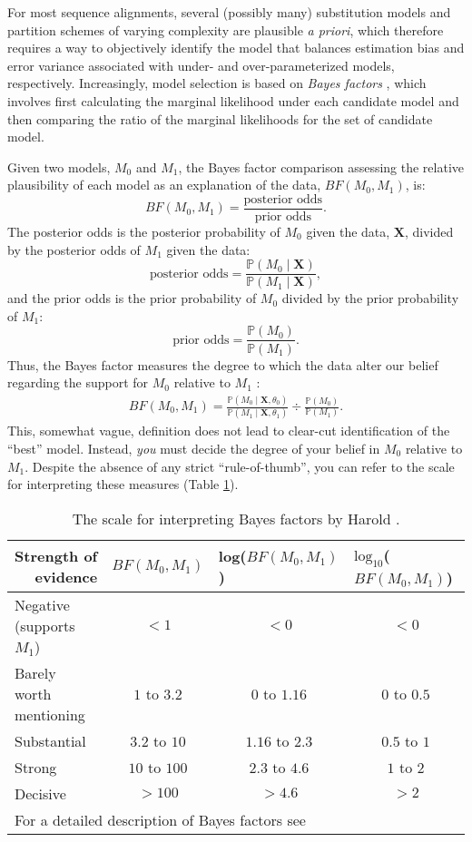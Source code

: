 For most sequence alignments, several (possibly many) substitution models and partition schemes of varying complexity are plausible {\it a priori}, which therefore requires a way to objectively identify the model that balances estimation bias and error variance associated with under- and over-parameterized models, respectively.
Increasingly, model selection is based on \textit{Bayes factors} \citep[{\it e.g.},][]{Suchard2001,Lartillot2006,Xie2011,Baele2012,Baele2013}, which involves first calculating the marginal likelihood under each candidate model and then comparing the ratio of the marginal likelihoods for the set of candidate model.

 
Given two models, $M_0$ and $M_1$, the Bayes factor comparison assessing the relative plausibility of each model as an explanation of the data, $BF(M_0,M_1)$, is:
$$BF(M_0,M_1) = \frac{\mbox{posterior odds}}{\mbox{prior odds}}.$$
The posterior odds is the posterior probability of $M_0$ given the data, $\mathbf X$, divided by the posterior odds of $M_1$ given the data:
$$\mbox{posterior odds} = \frac{\mathbb{P}(M_0 \mid \mathbf X)}{\mathbb{P}(M_1 \mid \mathbf X)},$$
and the prior odds is the prior probability of $M_0$ divided by the prior probability of $M_1$:
$$\mbox{prior odds} = \frac{\mathbb{P}(M_0)}{\mathbb{P}(M_1)}.$$
Thus, the Bayes factor measures the degree to which the data alter our belief regarding the support for $M_0$ relative to $M_1$ \citep{Lavine1999}:
\begin{align}\label{BFeq1}
BF(M_0,M_1) = \frac{\mathbb{P}(M_0 \mid \mathbf X, \theta_0)}{\mathbb{P}(M_1 \mid \mathbf X, \theta_1)} \div \frac{\mathbb{P}(M_0)}{\mathbb{P}(M_1)}. 
\end{align}
This, somewhat vague, definition does not lead to clear-cut identification of the ``best'' model. Instead, \textsl{you} must decide the degree of your belief in $M_0$ relative to $M_1$. 
Despite the absence of any strict ``rule-of-thumb'', you can refer to the scale \citep[outlined by][]{Jeffreys1961} for interpreting these measures (Table \ref{bftable}).
\begin{table}[h]
\centering
\caption{\small The scale for interpreting Bayes factors by Harold \citet{Jeffreys1961}.} 
\label{bftable}
\begin{tabular}{l c c c}
\hline
\multicolumn{1}{r}{{Strength of evidence}} & \multicolumn{1}{l}{\textbf{$BF(M_0, M_1)$}} & \multicolumn{1}{l}{\textbf{log($BF(M_0, M_1)$)}} &  \multicolumn{1}{l}{\textbf{$\text{log}_{10}$($BF(M_0, M_1)$)}}\\ 
\hline
Negative (supports $M_1$) & $<1$ & $<0$ & $<0$\\
Barely worth mentioning & $1$ to $3.2$ & $0$ to $1.16$ & $0$ to $0.5$\\
Substantial & $3.2$ to $10$ & $1.16$ to $2.3$ & $0.5$ to $1$ \\
Strong & $10$ to $100$ & $2.3$ to $4.6$ & $1$ to $2$ \\
Decisive& $>100$ & $>4.6$ & $>2$ \\
\hline
\multicolumn{3}{l}{{\scriptsize{For a detailed description of Bayes factors see \citet{Kass1995}}}} 
\end{tabular}
\end{table}


